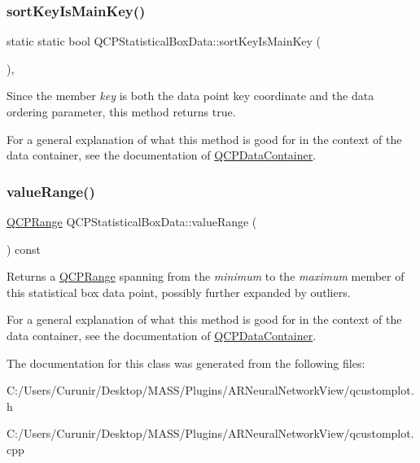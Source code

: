 \subsubsection{\texorpdfstring{sort\+Key\+Is\+Main\+Key()}{sortKeyIsMainKey()}}
{\footnotesize\ttfamily static static bool Q\+C\+P\+Statistical\+Box\+Data\+::sort\+Key\+Is\+Main\+Key (\begin{DoxyParamCaption}{ }\end{DoxyParamCaption})\hspace{0.3cm}{\ttfamily [inline]}, {\ttfamily [static]}}

Since the member {\itshape key} is both the data point key coordinate and the data ordering parameter, this method returns true.

For a general explanation of what this method is good for in the context of the data container, see the documentation of \hyperlink{class_q_c_p_data_container}{Q\+C\+P\+Data\+Container}. \mbox{\label{class_q_c_p_statistical_box_data_a1a2410fcf3d45fa3a1ad09e265b9bcad}} 
\subsubsection{\texorpdfstring{value\+Range()}{valueRange()}}
{\footnotesize\ttfamily \hyperlink{class_q_c_p_range}{Q\+C\+P\+Range} Q\+C\+P\+Statistical\+Box\+Data\+::value\+Range (\begin{DoxyParamCaption}{ }\end{DoxyParamCaption}) const\hspace{0.3cm}{\ttfamily [inline]}}

Returns a \hyperlink{class_q_c_p_range}{Q\+C\+P\+Range} spanning from the {\itshape minimum} to the {\itshape maximum} member of this statistical box data point, possibly further expanded by outliers.

For a general explanation of what this method is good for in the context of the data container, see the documentation of \hyperlink{class_q_c_p_data_container}{Q\+C\+P\+Data\+Container}. 

The documentation for this class was generated from the following files\+:\begin{DoxyCompactItemize}
\item 
C\+:/\+Users/\+Curunir/\+Desktop/\+M\+A\+S\+S/\+Plugins/\+A\+R\+Neural\+Network\+View/qcustomplot.\+h\item 
C\+:/\+Users/\+Curunir/\+Desktop/\+M\+A\+S\+S/\+Plugins/\+A\+R\+Neural\+Network\+View/qcustomplot.\+cpp\end{DoxyCompactItemize}

